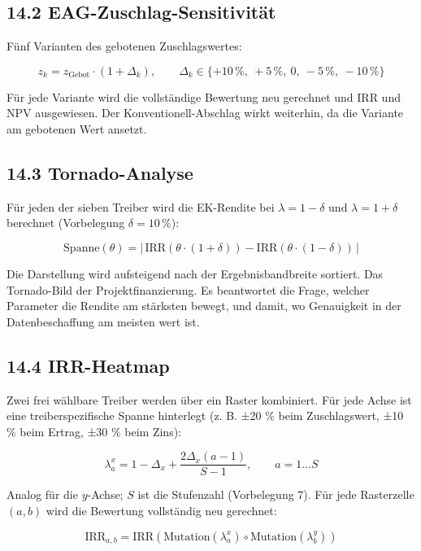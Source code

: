 \documentclass[
  a4paper,
  10pt]{article}
\begin{document}
\hypertarget{eag-zuschlag-sensitivituxe4t}{%
\subsection{14.2
EAG-Zuschlag-Sensitivität}\label{eag-zuschlag-sensitivituxe4t}}

Fünf Varianten des gebotenen Zuschlagswertes:

\[ z_k = z_{\mathrm{Gebot}} \cdot (1 + \Delta_k), \qquad \Delta_k \in \{+10\,\%,\ +5\,\%,\ 0,\ -5\,\%,\ -10\,\%\} \]

Für jede Variante wird die vollständige Bewertung neu gerechnet und IRR
und NPV ausgewiesen. Der Konventionell-Abschlag wirkt weiterhin, da die
Variante am gebotenen Wert ansetzt.

\hypertarget{tornado-analyse}{%
\subsection{14.3 Tornado-Analyse}\label{tornado-analyse}}

Für jeden der sieben Treiber wird die EK-Rendite bei
\(\lambda = 1 - \delta\) und \(\lambda = 1 + \delta\) berechnet
(Vorbelegung \(\delta = 10\,\%\)):

\[ \mathrm{Spanne}(\theta) = \left|\,\mathrm{IRR}(\theta \cdot (1+\delta)) - \mathrm{IRR}(\theta \cdot (1-\delta))\,\right| \]

Die Darstellung wird aufsteigend nach der Ergebnisbandbreite sortiert.
Das Tornado-Bild der Projektfinanzierung. Es beantwortet die Frage,
welcher Parameter die Rendite am stärksten bewegt, und damit, wo
Genauigkeit in der Datenbeschaffung am meisten wert ist.

\hypertarget{irr-heatmap}{%
\subsection{14.4 IRR-Heatmap}\label{irr-heatmap}}

Zwei frei wählbare Treiber werden über ein Raster kombiniert. Für jede
Achse ist eine treiberspezifische Spanne hinterlegt (z. B. ±20 \% beim
Zuschlagswert, ±10 \% beim Ertrag, ±30 \% beim Zins):

\[ \lambda^{x}_a = 1 - \Delta_x + \frac{2\Delta_x (a-1)}{S-1}, \qquad a = 1 \dots S \]

Analog für die \(y\)-Achse; \(S\) ist die Stufenzahl (Vorbelegung 7).
Für jede Rasterzelle \((a,b)\) wird die Bewertung vollständig neu
gerechnet:

\[ \mathrm{IRR}_{a,b} = \mathrm{IRR}\left(\text{Mutation}(\lambda^{x}_a) \circ \text{Mutation}(\lambda^{y}_b)\right) \]
\end{document}
